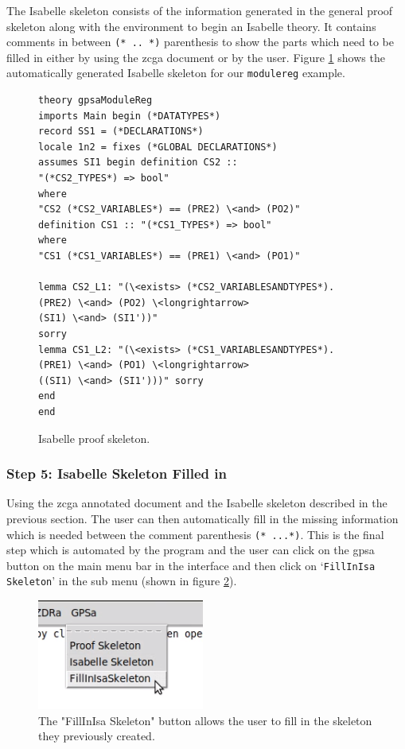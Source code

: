  The Isabelle skeleton consists of the information generated in the general
 proof skeleton along with the environment to begin an Isabelle theory. It
 contains comments in between \verb|(* .. *)| parenthesis to show the parts which
 need to be filled in either by using the \gls{zcga} document or by the user.
 Figure \ref{fig:isaFullexample} shows the automatically generated Isabelle
 skeleton for our \texttt{modulereg} example.

\begin{figure}[H]
\centering
\begin{scriptsize}
\begin{BVerbatim}
theory gpsaModuleReg
imports Main begin (*DATATYPES*)
record SS1 = (*DECLARATIONS*)
locale 1n2 = fixes (*GLOBAL DECLARATIONS*)
assumes SI1 begin definition CS2 ::
"(*CS2_TYPES*) => bool"
where
"CS2 (*CS2_VARIABLES*) == (PRE2) \<and> (PO2)"
definition CS1 :: "(*CS1_TYPES*) => bool"
where
"CS1 (*CS1_VARIABLES*) == (PRE1) \<and> (PO1)"

lemma CS2_L1: "(\<exists> (*CS2_VARIABLESANDTYPES*).
(PRE2) \<and> (PO2) \<longrightarrow> 
(SI1) \<and> (SI1'))" 
sorry 
lemma CS1_L2: "(\<exists> (*CS1_VARIABLESANDTYPES*).
(PRE1) \<and> (PO1) \<longrightarrow> 
((SI1) \<and> (SI1')))" sorry 
end
end
\end{BVerbatim}
\end{scriptsize}
\caption{Isabelle proof skeleton. \label{fig:isaFullexample}}
\end{figure}

\subsubsection{Step 5: Isabelle Skeleton Filled in}

Using the \gls{zcga} annotated document and the Isabelle skeleton described in
the previous section. The user can then automatically fill in the missing
information which is needed between the comment parenthesis \verb|(* ...*)|.
This is the final step which is automated by the program and the user can click
on the \gls{gpsa} button on the main menu bar in the interface and then click on
`\texttt{FillInIsa Skeleton}' in the sub menu (shown in figure
\ref{fig:fillinisa}).

\begin{figure}[H]
\centering
\includegraphics[scale=1]{Figures/fullexample/fillinisabutton.png}
\caption{The "FillInIsa Skeleton" button allows the user to fill in the skeleton they previously created. \label{fig:fillinisa}}
\end{figure}

